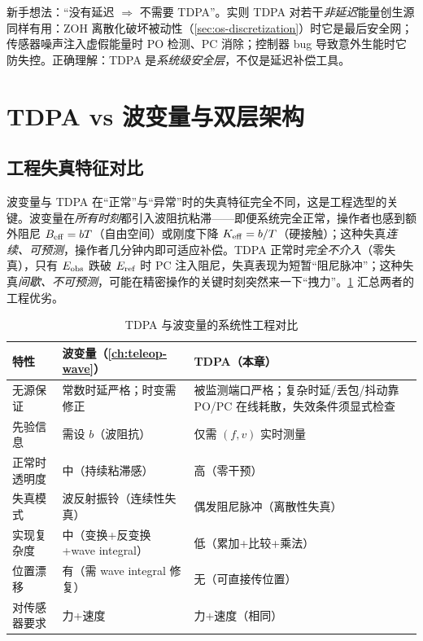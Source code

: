 \begin{pitfall}
新手想法：“没有延迟 $\Rightarrow$ 不需要 TDPA”。实则 TDPA 对若干\emph{非延迟}能量创生源同样有用：ZOH 离散化破坏被动性（\cref{sec:os-discretization}）时它是最后安全网；传感器噪声注入虚假能量时 PO 检测、PC 消除；控制器 bug 导致意外生能时它防失控。正确理解：TDPA 是\emph{系统级安全层}，不仅是延迟补偿工具。
\end{pitfall}

\section{TDPA vs 波变量与双层架构}
\label{sec:tdpa-compare}

\subsection{工程失真特征对比}
\label{sec:tdpa-compare-distortion}

波变量与 TDPA 在“正常”与“异常”时的失真特征完全不同，这是工程选型的关键。波变量在\emph{所有时刻}都引入波阻抗粘滞——即便系统完全正常，操作者也感到额外阻尼 $B_{\rm eff}=bT$（自由空间）或刚度下降 $K_{\rm eff}=b/T$（硬接触）；这种失真\emph{连续、可预测}，操作者几分钟内即可适应补偿。TDPA 正常时\emph{完全不介入}（零失真），只有 $E_{\rm obs}$ 跌破 $E_{\rm ref}$ 时 PC 注入阻尼，失真表现为短暂“阻尼脉冲”；这种失真\emph{间歇、不可预测}，可能在精密操作的关键时刻突然来一下“拽力”。\cref{tab:tdpa-vs-wave} 汇总两者的工程优劣。

\begin{table}[H]\centering\small
\caption{TDPA 与波变量的系统性工程对比}
\label{tab:tdpa-vs-wave}
\begin{tabular}{p{} p{} p{}}
\toprule
特性 & 波变量（\cref{ch:teleop-wave}） & TDPA（本章） \\
\midrule
无源保证 & 常数时延严格；时变需修正 & 被监测端口严格；复杂时延/丢包/抖动靠 PO/PC 在线耗散，失效条件须显式检查 \\
先验信息 & 需设 $b$（波阻抗） & 仅需 $(f,v)$ 实时测量 \\
正常时透明度 & 中（持续粘滞感） & 高（零干预） \\
失真模式 & 波反射振铃（连续性失真） & 偶发阻尼脉冲（离散性失真） \\
实现复杂度 & 中（变换+反变换+wave integral） & 低（累加+比较+乘法） \\
位置漂移 & 有（需 wave integral 修复） & 无（可直接传位置） \\
对传感器要求 & 力+速度 & 力+速度（相同） \\
\bottomrule
\end{tabular}
\end{table}

